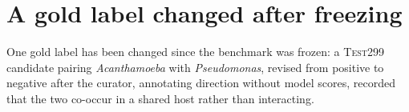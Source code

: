 \documentclass[11pt]{article}
\begin{document}
\section{A gold label changed after freezing}
\label{app:relabel}

One gold label has been changed since the benchmark was frozen: a \textsc{Test299} candidate
pairing \emph{Acanthamoeba} with \emph{Pseudomonas}, revised from positive to negative after the
curator, annotating direction without model scores, recorded that the two co-occur in a shared host
rather than interacting.
\end{document}
